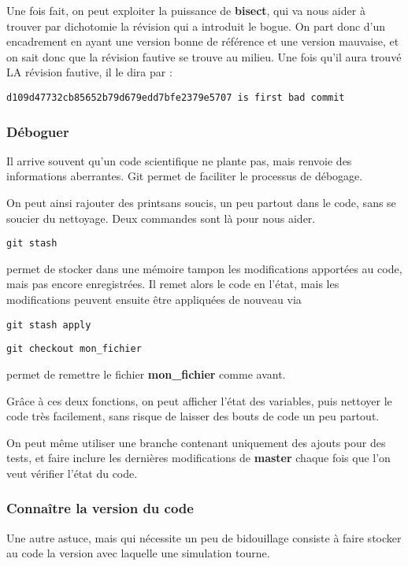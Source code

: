 Une fois fait, on peut exploiter la puissance de \textbf{bisect}, qui va nous aider à trouver par dichotomie la révision qui a introduit le bogue. On part donc d'un encadrement en ayant une version bonne de référence et une version mauvaise, et on sait donc que la révision fautive se trouve au milieu.
Une fois qu'il aura trouvé LA révision fautive, il le dira par :
\begin{verbatim}
d109d47732cb85652b79d679edd7bfe2379e5707 is first bad commit
\end{verbatim}


\subsubsection{Déboguer}
Il arrive souvent qu'un code scientifique ne plante pas, mais renvoie des informations aberrantes. Git permet de faciliter le processus de débogage. 

On peut ainsi rajouter des \og print\fg sans soucis, un peu partout dans le code, sans se soucier du nettoyage. Deux commandes sont là pour nous aider. 

\begin{verbatim}
git stash
\end{verbatim}
permet de stocker dans une mémoire tampon les modifications apportées au code, mais pas encore enregistrées. Il remet alors le code en l'état, mais les modifications peuvent ensuite être appliquées de nouveau via 
\begin{verbatim}
git stash apply
\end{verbatim}

\bigskip

\begin{verbatim}
git checkout mon_fichier
\end{verbatim}
permet de remettre le fichier \textbf{mon\_fichier} comme avant. 

\bigskip

Grâce à ces deux fonctions, on peut afficher l'état des variables, puis nettoyer le code très facilement, sans risque de laisser des bouts de code un peu partout. 

On peut même utiliser une branche contenant uniquement des ajouts pour des tests, et faire inclure les dernières modifications de \textbf{master} chaque fois que l'on veut vérifier l'état du code. 

\subsubsection{Connaître la version du code} 
Une autre astuce, mais qui nécessite un peu de bidouillage consiste à faire stocker au code la version avec laquelle une simulation tourne. 

